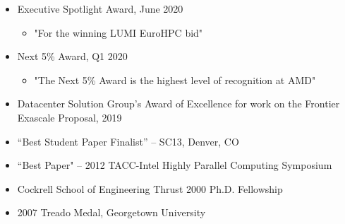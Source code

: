 \vspace{-0.3in}

\begin{itemize}
	\itemsep 0pt
	\item Executive Spotlight Award, June 2020
		\begin{itemize}
		\item "For the winning LUMI EuroHPC bid"
		\end{itemize}
	\item Next 5\% Award, Q1 2020
	\begin{itemize}
	\item "The Next 5\% Award is the highest level of recognition at AMD"
	\end{itemize}
	\item Datacenter Solution Group’s Award of Excellence for work on the Frontier Exascale Proposal, 2019 
        \item ``Best Student Paper Finalist'' -- SC13, Denver, CO
	\item ``Best Paper" -- 2012 TACC-Intel Highly Parallel Computing
	      Symposium 
        \item Cockrell School of Engineering Thrust 2000 Ph.D. Fellowship
        \item 2007 Treado Medal, Georgetown University      
\end{itemize}

